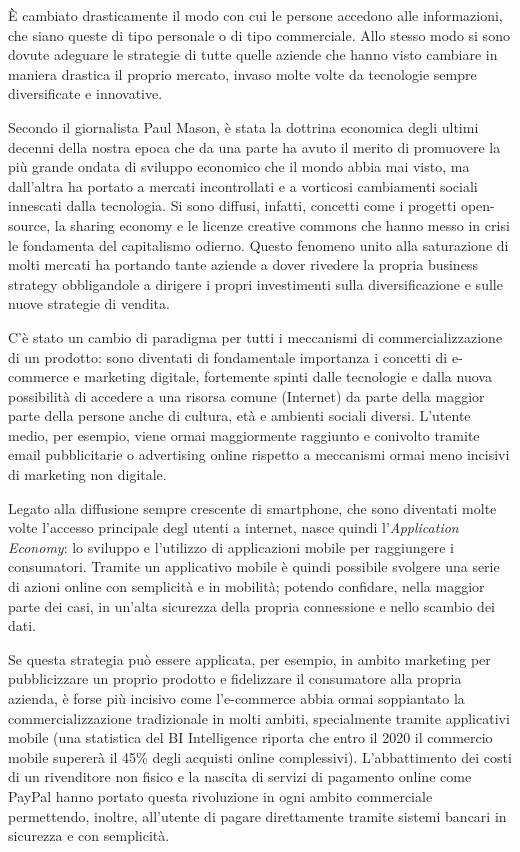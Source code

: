 È cambiato drasticamente il modo con cui le persone accedono alle informazioni, che siano queste di tipo personale o di tipo commerciale.
Allo stesso modo si sono dovute adeguare le strategie di tutte quelle aziende che hanno visto cambiare in maniera drastica il proprio mercato, invaso molte volte da tecnologie sempre diversificate e innovative.

Secondo il giornalista Paul Mason, è stata la dottrina economica degli ultimi decenni della nostra epoca che da una parte ha avuto il merito di promuovere la più grande ondata di sviluppo economico che il mondo abbia mai visto, ma dall’altra ha portato a mercati incontrollati e a vorticosi cambiamenti sociali innescati dalla tecnologia.
Si sono diffusi, infatti, concetti come i progetti open-source, la sharing economy e le licenze creative commons che hanno messo in crisi le fondamenta del capitalismo odierno.
Questo fenomeno unito alla saturazione di molti mercati ha portando tante aziende a dover rivedere la propria business strategy obbligandole a dirigere i propri investimenti sulla diversificazione e sulle nuove strategie di vendita. \autocite{POSTCAPITALISMO}

C'è stato un cambio di paradigma per tutti i meccanismi di commercializzazione di un prodotto: sono diventati di fondamentale importanza i concetti di e-commerce e marketing digitale, fortemente spinti dalle tecnologie e dalla nuova possibilità di accedere a una risorsa comune (Internet) da parte della maggior parte della persone anche di cultura, età e ambienti sociali diversi.
L'utente medio, per esempio, viene ormai maggiormente raggiunto e conivolto tramite email pubblicitarie o advertising online rispetto a meccanismi ormai meno incisivi di marketing non digitale.

Legato alla diffusione sempre crescente di smartphone, che sono diventati molte volte l'accesso principale degl utenti a internet, nasce quindi l'\textit{Application Economy}: lo sviluppo e l'utilizzo di applicazioni mobile per raggiungere i consumatori.
Tramite un applicativo mobile è quindi possibile svolgere una serie di azioni online con semplicità e in mobilità; potendo confidare, nella maggior parte dei casi, in un'alta sicurezza della propria connessione e nello scambio dei dati.

Se questa strategia può essere applicata, per esempio, in ambito marketing per pubblicizzare un proprio prodotto e fidelizzare il consumatore alla propria azienda, è forse più incisivo come l'e-commerce abbia ormai soppiantato la commercializzazione tradizionale in molti ambiti, specialmente tramite applicativi mobile (una statistica del BI Intelligence riporta che entro il 2020 il commercio mobile supererà il 45\% degli acquisti online complessivi).
L'abbattimento dei costi di un rivenditore non fisico e la nascita di servizi di pagamento online come PayPal hanno portato questa rivoluzione in ogni ambito commerciale permettendo, inoltre, all'utente di pagare direttamente tramite sistemi bancari in sicurezza e con semplicità.

